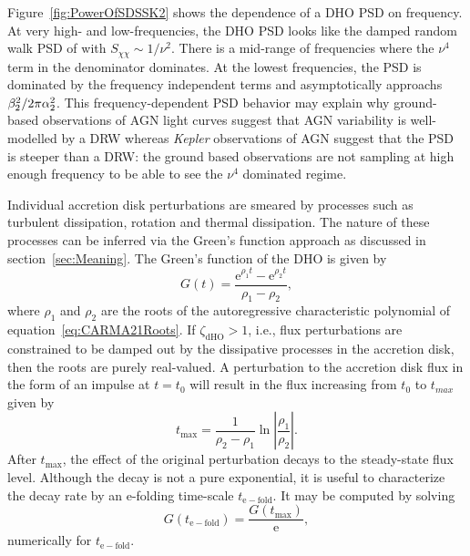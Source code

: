 \documentclass[a4paper,fleqn,usenatbib]{mnras}
\begin{document}
Figure~\ref{fig:PowerOfSDSSK2} shows the dependence of a DHO PSD on frequency. At very high- and low-frequencies, the DHO PSD looks like the damped random walk PSD of \citet{Kelly09} with $S_{\chi\chi} \sim 1/\nu^{2}$. There is a mid-range of frequencies where the $\nu^{4}$ term in the denominator dominates. At the lowest frequencies, the PSD is dominated by the frequency independent terms and asymptotically approachs $\beta_{2}^{2}/2\pi \alpha_{2}^{2}$. This frequency-dependent PSD behavior may explain why ground-based observations of AGN light curves suggest that AGN variability is well-modelled by a DRW whereas \textit{Kepler} observations of AGN suggest that the PSD is steeper than a DRW: the ground based observations are not sampling at high enough frequency to be able to see the $\nu^{4}$ dominated regime.

Individual accretion disk perturbations are smeared by processes such as turbulent dissipation, rotation and thermal dissipation. The nature of these processes can be inferred via the Green's function approach as discussed in section~\ref{sec:Meaning}. The Green's function of the DHO is given by
\begin{equation}\label{eq:DHOGFunc}
G(t) = \frac{\mathrm{e}^{\rho_{1}t} - \mathrm{e}^{\rho_{2}t}}{\rho_{1} - \rho_{2}},
\end{equation}
where $\rho_{1}$ and $\rho_{2}$ are the roots of the autoregressive characteristic polynomial of equation~\eqref{eq:CARMA21Roots}. If $\zeta_{\mathrm{dHO}} > 1$, i.e., flux perturbations are constrained to be damped out by the dissipative processes in the accretion disk, then the roots are purely real-valued. A perturbation to the accretion disk flux in the form of an impulse at $t = t_{0}$ will result in the flux increasing from $t_{0}$ to $t_{max}$ given by
\begin{equation}\label{eq:maxT}
t_{\mathrm{max}} = \frac{1}{\rho_{2} - \rho_{1}} \ln \left| \frac{\rho_{1}}{\rho_{2}} \right|.
\end{equation}
After $t_{\mathrm{max}}$, the effect of the original perturbation decays to the steady-state flux level. Although the decay is not a pure exponential, it is useful to characterize the decay rate by an e-folding time-scale $t_{\mathrm{e-fold}}$. It may be computed by solving
\begin{equation}\label{eq:TEFold}
G(t_{\mathrm{e-fold}}) = \frac{G(t_{\mathrm{max}})}{\mathrm{e}},
\end{equation}
numerically for $t_{\mathrm{e-fold}}$.
\end{document}
